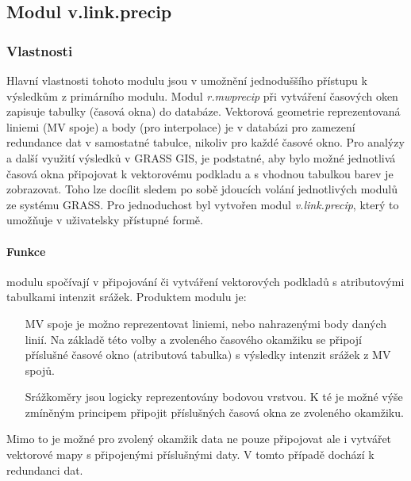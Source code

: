 \documentclass[a4paper,12pt,oneside]{report}
\begin{document}
\subsection{Modul v.link.precip}
\subsubsection{Vlastnosti}
Hlavní vlastnosti tohoto modulu jsou v umožnění  jednoduššího přístupu k
výsled\-kům z primárního modulu. Modul \textit{r.mwprecip} při vytváření
časových oken zapisuje tabulky (časová okna) do databáze. Vektorová geometrie
reprezentovaná liniemi (MV spoje) a body (pro interpolace) je v databázi
pro zamezení redundance dat v samostatné tabulce, nikoliv pro každé
časové okno. Pro analýzy a další využití výsledků v GRASS GIS, je
podstatné, aby bylo možné jednotlivá časová okna připojovat k
vektorovému podkladu a s vhodnou tabulkou barev je zobrazovat.  Toho
lze docílit sledem po sobě jdoucích volání jednotlivých modulů ze systému
GRASS. Pro jednoduchost byl vytvořen modul \textit{v.link.precip},
který to umožňuje v uživatelsky přístupné formě.

\paragraph*{Funkce} modulu spočívají v připojování či vytváření vektorových
 podkladů s atributovými tabulkami intenzit srážek. Produktem modulu je:
 
\begin{itemize}
\item[MV spoje] je možno reprezentovat liniemi, nebo nahrazenými body daných linií.
 Na základě této volby a zvoleného časového okamžiku se připojí příslušné časové okno
  (atributová tabulka) s výsledky intenzit srážek z MV spojů.
\item[Srážkoměry] jsou logicky reprezentovány bodovou vrstvou. K té je možné výše 
zmíněným principem připojit příslušných časová okna ze zvoleného okamžiku.
\end{itemize} 
 
Mimo to je možné pro zvolený  okamžik data ne pouze připojovat ale i vytvářet vektorové mapy s připojenými příslušnými daty. V tomto případě dochází k redundanci dat. 
 
\end{document}
